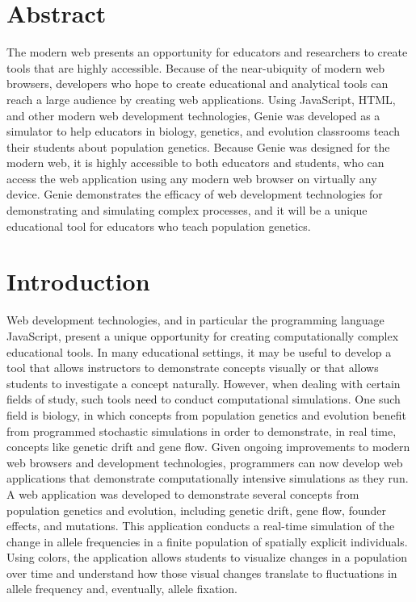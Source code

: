 \documentclass[12pt]{article}
\begin{document}
\begin{spacing}{1.6}

\section{Abstract}

The modern web presents an opportunity for educators and researchers to create tools that are highly accessible. Because of the near-ubiquity of modern web browsers, developers who hope to create educational and analytical tools can reach a large audience by creating web applications. Using JavaScript, HTML, and other modern web development technologies, Genie was developed as a simulator to help educators in biology, genetics, and evolution classrooms teach their students about population genetics. Because Genie was designed for the modern web, it is highly accessible to both educators and students, who can access the web application using any modern web browser on virtually any device. Genie demonstrates the efficacy of web development technologies for demonstrating and simulating complex processes, and it will be a unique educational tool for educators who teach population genetics.

\section{Introduction}

Web development technologies, and in particular the programming language JavaScript, present a unique opportunity for creating computationally complex educational tools. In many educational settings, it may be useful to develop a tool that allows instructors to demonstrate concepts visually or that allows students to investigate a concept naturally. However, when dealing with certain fields of study, such tools need to conduct computational simulations. One such field is biology, in which concepts from population genetics and evolution benefit from programmed stochastic simulations in order to demonstrate, in real time, concepts like genetic drift and gene flow. Given ongoing improvements to modern web browsers and development technologies, programmers can now develop web applications that demonstrate computationally intensive simulations as they run. A web application was developed to demonstrate several concepts from population genetics and evolution, including genetic drift, gene flow, founder effects, and mutations. This application conducts a real-time simulation of the change in allele frequencies in a finite population of spatially explicit individuals. Using colors, the application allows students to visualize changes in a population over time and understand how those visual changes translate to fluctuations in allele frequency and, eventually, allele fixation.


\end{spacing}
\end{document}
